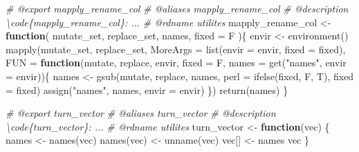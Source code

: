 \documentclass[
]{article}
\newenvironment{Shaded}{\begin{snugshade}}{\end{snugshade}}
\newcommand{\AttributeTok}[1]{\textcolor[rgb]{0.77,0.63,0.00}{#1}}
\newcommand{\CommentTok}[1]{\textcolor[rgb]{0.56,0.35,0.01}{\textit{#1}}}
\newcommand{\ControlFlowTok}[1]{\textcolor[rgb]{0.13,0.29,0.53}{\textbf{#1}}}
\newcommand{\FunctionTok}[1]{\textcolor[rgb]{0.00,0.00,0.00}{#1}}
\newcommand{\NormalTok}[1]{#1}
\newcommand{\OtherTok}[1]{\textcolor[rgb]{0.56,0.35,0.01}{#1}}
\newcommand{\StringTok}[1]{\textcolor[rgb]{0.31,0.60,0.02}{#1}}
\begin{document}
\begin{Shaded}
\begin{Highlighting}[]
\CommentTok{\#\textquotesingle{} @export mapply\_rename\_col}
\CommentTok{\#\textquotesingle{} @aliases mapply\_rename\_col}
\CommentTok{\#\textquotesingle{} @description \textbackslash{}code\{mapply\_rename\_col\}: ...}
\CommentTok{\#\textquotesingle{} @rdname utilites}
\NormalTok{mapply\_rename\_col }\OtherTok{\textless{}{-}} 
  \ControlFlowTok{function}\NormalTok{(}
\NormalTok{           mutate\_set,}
\NormalTok{           replace\_set,}
\NormalTok{           names,}
           \AttributeTok{fixed =}\NormalTok{ F}
\NormalTok{           )\{}
\NormalTok{    envir }\OtherTok{\textless{}{-}} \FunctionTok{environment}\NormalTok{()}
    \FunctionTok{mapply}\NormalTok{(mutate\_set, replace\_set,}
           \AttributeTok{MoreArgs =} \FunctionTok{list}\NormalTok{(}\AttributeTok{envir =}\NormalTok{ envir, }\AttributeTok{fixed =}\NormalTok{ fixed),}
           \AttributeTok{FUN =} \ControlFlowTok{function}\NormalTok{(mutate, replace, envir,}
                          \AttributeTok{fixed =}\NormalTok{ F, }\AttributeTok{names =} \FunctionTok{get}\NormalTok{(}\StringTok{"names"}\NormalTok{, }\AttributeTok{envir =}\NormalTok{ envir))\{}
\NormalTok{             names }\OtherTok{\textless{}{-}} \FunctionTok{gsub}\NormalTok{(mutate, replace, names, }\AttributeTok{perl =} \FunctionTok{ifelse}\NormalTok{(fixed, F, T), }\AttributeTok{fixed =}\NormalTok{ fixed)}
             \FunctionTok{assign}\NormalTok{(}\StringTok{"names"}\NormalTok{, names, }\AttributeTok{envir =}\NormalTok{ envir)}
\NormalTok{           \})}
    \FunctionTok{return}\NormalTok{(names)}
\NormalTok{  \}}

\CommentTok{\#\textquotesingle{} @export turn\_vector}
\CommentTok{\#\textquotesingle{} @aliases turn\_vector}
\CommentTok{\#\textquotesingle{} @description \textbackslash{}code\{turn\_vector\}: ...}
\CommentTok{\#\textquotesingle{} @rdname utilites}
\NormalTok{turn\_vector }\OtherTok{\textless{}{-}} \ControlFlowTok{function}\NormalTok{(vec) \{}
\NormalTok{  names }\OtherTok{\textless{}{-}} \FunctionTok{names}\NormalTok{(vec)}
  \FunctionTok{names}\NormalTok{(vec) }\OtherTok{\textless{}{-}} \FunctionTok{unname}\NormalTok{(vec)}
\NormalTok{  vec[] }\OtherTok{\textless{}{-}}\NormalTok{ names}
\NormalTok{  vec}
\NormalTok{\}}


\end{Highlighting}
\end{Shaded}
\end{document}
